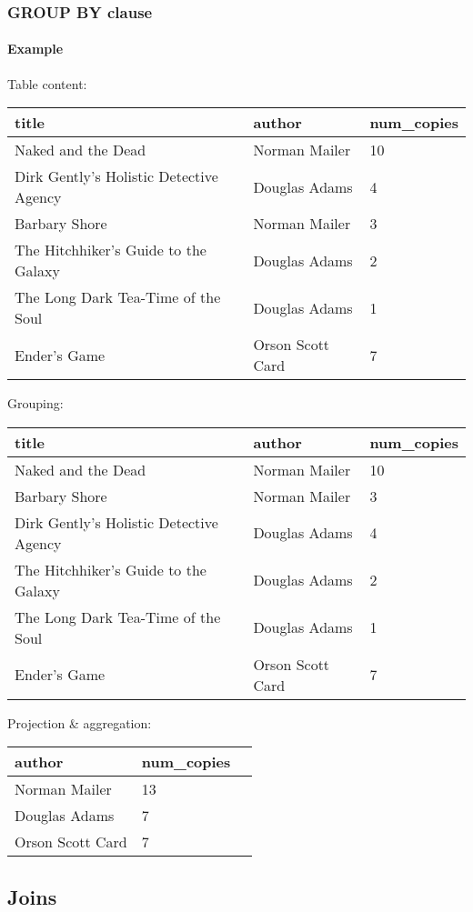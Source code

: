 \documentclass{beamer}
\begin{document}
\begin{frame}
  \frametitle{GROUP BY clause}
  \framesubtitle{Example}
{\small
Table content:
\begin{center}
\begin{tabular}{|l|l|l|}
\hline
title & author & num\_copies \\
\hline
\hline
Naked and the Dead & Norman Mailer & 10 \\
Dirk Gently's Holistic Detective Agency & Douglas Adams & 4 \\
Barbary Shore & Norman Mailer & 3 \\
The Hitchhiker's Guide to the Galaxy & Douglas Adams & 2 \\
The Long Dark Tea-Time of the Soul & Douglas Adams & 1 \\
Ender's Game & Orson Scott Card & 7 \\
\hline
\end{tabular}
\end{center}
\framebreak
Grouping: 
\begin{center}
\begin{tabular}{|l|l|l|}
\hline
title & author & num\_copies \\
\hline
\hline
Naked and the Dead & Norman Mailer & 10 \\
Barbary Shore & Norman Mailer & 3 \\
Dirk Gently's Holistic Detective Agency & Douglas Adams & 4 \\
The Hitchhiker's Guide to the Galaxy & Douglas Adams & 2 \\
The Long Dark Tea-Time of the Soul & Douglas Adams & 1 \\
Ender's Game & Orson Scott Card & 7 \\
\hline
\end{tabular}
\end{center}

Projection \& aggregation:
\begin{center}
\begin{tabular}{|l|l|l|}
\hline
author & num\_copies \\
\hline
\hline
Norman Mailer & 13 \\
Douglas Adams & 7 \\
Orson Scott Card & 7 \\
\hline
\end{tabular}
\end{center}
}
\end{frame}

\subsection{Joins}
\end{document}
